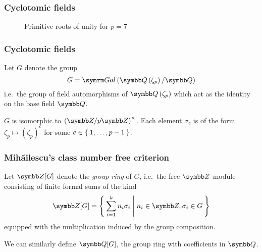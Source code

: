 \begin{frame}[fragile]
\frametitle{Cyclotomic fields}

\begin{figure}
    \caption*{Primitive roots of unity for \(p = 7\)}
\end{figure}
\end{frame}

\begin{frame}
\frametitle{Cyclotomic fields}

Let \(G\) denote the group
\[
    G = \Gal{\rationals\left(\zeta_p\right)}{\rationals}
\]
i.e.\ the group of field automorphisms of \(\rationals\left(\zeta_p\right)\) which act as the identity on the base field \(\rationals\).

\vspace{1em}

\begin{proposition}
\(G\) is isomorphic to \(\left(\integers/p\integers\right)^{\times}\). Each element \(\sigma_c\) is of the form \(\zeta_p \mapsto \left(\zeta_p\right)^c\) for some \(c \in \Set{1, \dots, p - 1}\).
\end{proposition}
\end{frame}

\begin{frame}
\frametitle{Mihăilescu's class number free criterion}

\begin{definition}
Let \(\integers[G]\) denote the \emph{group ring} of \(G\), i.e.\ the free \(\integers\)-module consisting of finite formal sums of the kind
\[
    \integers[G] = \Set{ \sum_{i = 1}^{k} n_i \sigma_i | n_i \in \integers, \sigma_i \in G}
\]
equipped with the multiplication induced by the group composition.
\end{definition}

\vspace{1em}

We can similarly define \(\rationals[G]\), the group ring with coefficients in \(\rationals\).
\end{frame}

